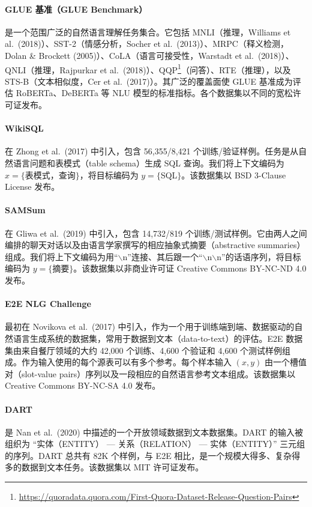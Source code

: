 \documentclass[11pt,UTF8,fontset=fandol]{ctexart}
\begin{document}
\paragraph{GLUE 基准（GLUE Benchmark）}是一个范围广泛的自然语言理解任务集合。它包括 MNLI（推理，Williams et al.\ (2018)）、SST-2（情感分析，Socher et al.\ (2013)）、MRPC（释义检测，Dolan \& Brockett (2005)）、CoLA（语言可接受性，Warstadt et al.\ (2018)）、QNLI（推理，Rajpurkar et al.\ (2018)）、QQP\footnote{\url{https://quoradata.quora.com/First-Quora-Dataset-Release-Question-Pairs}}（问答）、RTE（推理），以及 STS-B（文本相似度，Cer et al.\ (2017)）。其广泛的覆盖面使 GLUE 基准成为评估 RoBERTa、DeBERTa 等 NLU 模型的标准指标。各个数据集以不同的宽松许可证发布。

\paragraph{WikiSQL}在 Zhong et al.\ (2017) 中引入，包含 56{,}355/8{,}421 个训练/验证样例。任务是从自然语言问题和表模式（table schema）生成 SQL 查询。我们将上下文编码为 $x=\{$表模式，查询$\}$，将目标编码为 $y=\{$SQL$\}$。该数据集以 BSD 3-Clause License 发布。

\paragraph{SAMSum}在 Gliwa et al.\ (2019) 中引入，包含 14{,}732/819 个训练/测试样例。它由两人之间编排的聊天对话以及由语言学家撰写的相应抽象式摘要（abstractive summaries）组成。我们将上下文编码为用“$\backslash$n”连接、其后跟一个“$\backslash$n$\backslash$n”的话语序列，将目标编码为 $y=\{$摘要$\}$。该数据集以非商业许可证 Creative Commons BY-NC-ND 4.0 发布。

\paragraph{E2E NLG Challenge}最初在 Novikova et al.\ (2017) 中引入，作为一个用于训练端到端、数据驱动的自然语言生成系统的数据集，常用于数据到文本（data-to-text）的评估。E2E 数据集由来自餐厅领域的大约 42{,}000 个训练、4{,}600 个验证和 4{,}600 个测试样例组成。作为输入使用的每个源表可以有多个参考。每个样本输入 $(x,y)$ 由一个槽值对（slot-value pairs）序列以及一段相应的自然语言参考文本组成。该数据集以 Creative Commons BY-NC-SA 4.0 发布。

\paragraph{DART}是 Nan et al.\ (2020) 中描述的一个开放领域数据到文本数据集。DART 的输入被组织为 “实体（ENTITY） --- 关系（RELATION） --- 实体（ENTITY）” 三元组的序列。DART 总共有 82K 个样例，与 E2E 相比，是一个规模大得多、复杂得多的数据到文本任务。该数据集以 MIT 许可证发布。
\end{document}
